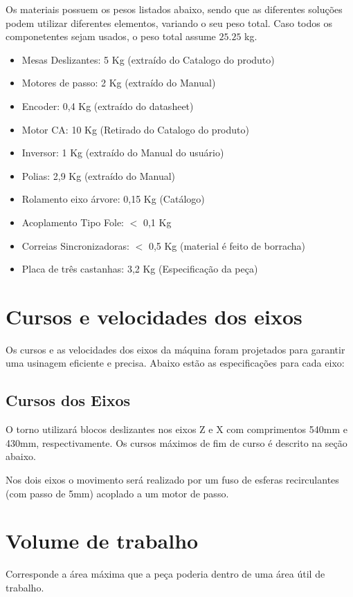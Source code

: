 Os materiais possuem os pesos listados abaixo, sendo que as diferentes soluções podem utilizar diferentes elementos, variando o seu peso total. Caso todos os componetentes sejam usados, o peso total assume $25.25$ kg. 

\begin{itemize}
    \item Mesas Deslizantes: 5 Kg (extraído do Catalogo do produto)
    \item Motores de passo: 2 Kg (extraído do Manual)
    \item Encoder: 0,4 Kg (extraído do datasheet)
    \item Motor CA: 10 Kg (Retirado do Catalogo do produto)
    \item Inversor: 1 Kg (extraído do Manual do usuário)
    \item Polias: 2,9 Kg (extraído do Manual)
    \item Rolamento eixo árvore: 0,15 Kg (Catálogo)
    \item Acoplamento Tipo Fole:  $ \lt $  0,1 Kg
    \item Correias Sincronizadoras: $ \lt $ 0,5 Kg (material é feito de borracha)
    \item Placa de três castanhas: 3,2 Kg (Especificação da peça)
\end{itemize}

\newpage
\section{Cursos e velocidades dos eixos}

Os cursos e as velocidades dos eixos da máquina foram projetados para garantir uma usinagem eficiente e precisa. Abaixo estão as especificações para cada eixo:

\subsection{Cursos dos Eixos}
O torno utilizará blocos deslizantes nos eixos Z e X com comprimentos 540mm e 430mm, respectivamente. Os cursos máximos de fim de curso é descrito na seção abaixo. 

Nos dois eixos o movimento será realizado por um fuso de esferas recirculantes (com passo de 5mm) acoplado a um motor de passo. 

\section{Volume de trabalho}
Corresponde a área máxima que a peça poderia dentro de uma área útil de trabalho.

